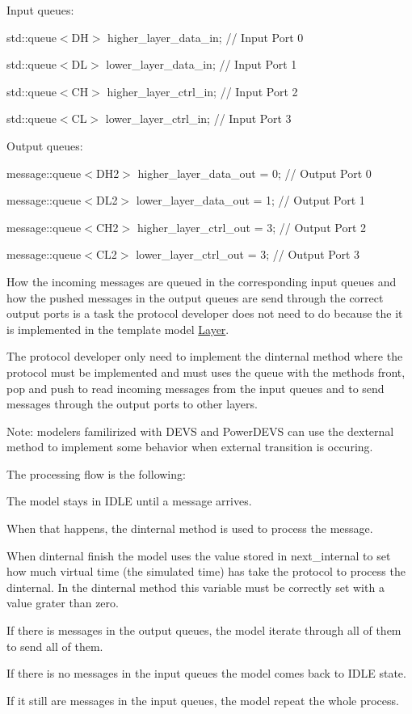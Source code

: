 Input queues\+:
\begin{DoxyItemize}
\item std\+::queue$<$\+D\+H$>$ higher\+\_\+layer\+\_\+data\+\_\+in; // Input Port 0
\item std\+::queue$<$\+D\+L$>$ lower\+\_\+layer\+\_\+data\+\_\+in; // Input Port 1
\item std\+::queue$<$\+C\+H$>$ higher\+\_\+layer\+\_\+ctrl\+\_\+in; // Input Port 2
\item std\+::queue$<$\+C\+L$>$ lower\+\_\+layer\+\_\+ctrl\+\_\+in; // Input Port 3
\end{DoxyItemize}

Output queues\+:
\begin{DoxyItemize}
\item message\+::queue$<$\+D\+H2$>$ higher\+\_\+layer\+\_\+data\+\_\+out = 0; // Output Port 0
\item message\+::queue$<$\+D\+L2$>$ lower\+\_\+layer\+\_\+data\+\_\+out = 1; // Output Port 1
\item message\+::queue$<$\+C\+H2$>$ higher\+\_\+layer\+\_\+ctrl\+\_\+out = 3; // Output Port 2
\item message\+::queue$<$\+C\+L2$>$ lower\+\_\+layer\+\_\+ctrl\+\_\+out = 3; // Output Port 3
\end{DoxyItemize}

How the incoming messages are queued in the corresponding input queues and how the pushed messages in the output queues are send through the correct output ports is a task the protocol developer does not need to do because the it is implemented in the template model \hyperlink{classLayer}{Layer}.

The protocol developer only need to implement the dinternal method where the protocol must be implemented and must uses the queue with the methods front, pop and push to read incoming messages from the input queues and to send messages through the output ports to other layers.

Note\+: modelers familirized with D\+E\+VS and Power\+D\+E\+VS can use the dexternal method to implement some behavior when external transition is occuring.

The processing flow is the following\+:
\begin{DoxyEnumerate}
\item The model stays in I\+D\+LE until a message arrives.
\item When that happens, the dinternal method is used to process the message.
\item When dinternal finish the model uses the value stored in next\+\_\+internal to set how much virtual time (the simulated time) has take the protocol to process the dinternal. In the dinternal method this variable must be correctly set with a value grater than zero.
\item If there is messages in the output queues, the model iterate through all of them to send all of them.
\item If there is no messages in the input queues the model comes back to I\+D\+LE state.
\item If it still are messages in the input queues, the model repeat the whole process.
\end{DoxyEnumerate}

